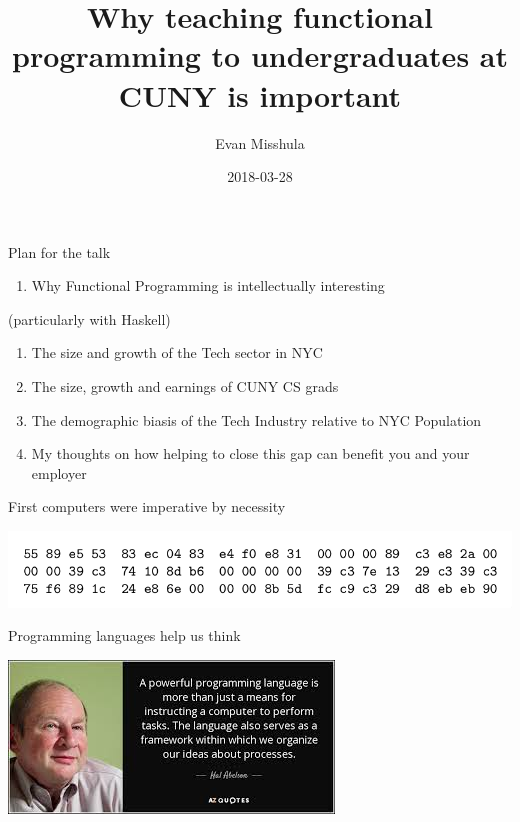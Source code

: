 \documentclass[presetation]{beamer}
\author{Evan Misshula}
\date{2018-03-28}
\title{Why teaching functional programming to undergraduates at CUNY is important}
\begin{document}
\maketitle

\begin{frame}[label={sec:org86111c2}]{Plan for the talk}
\begin{enumerate}
\item Why Functional Programming is intellectually interesting
\end{enumerate}
\pause   
(particularly with Haskell)
\pause
\begin{enumerate}
\item The size and growth of the Tech sector in NYC
\item The size, growth and earnings of CUNY CS grads
\item The demographic biasis of the Tech Industry relative to NYC Population
\item My thoughts on how helping to close this gap can benefit you and
your employer
\end{enumerate}
\end{frame}


\begin{frame}[label={sec:org559d467}]{First computers were imperative by necessity}
\begin{center}
\includegraphics[width=.9\linewidth]{./images/machineCode.png}
\end{center}
\end{frame}

\begin{frame}[label={sec:orgc7373ce}]{Programming languages help us think}
\begin{center}
\includegraphics[width=.9\linewidth]{./images/lang.jpeg}
\end{center}
\end{frame}
\end{document}
